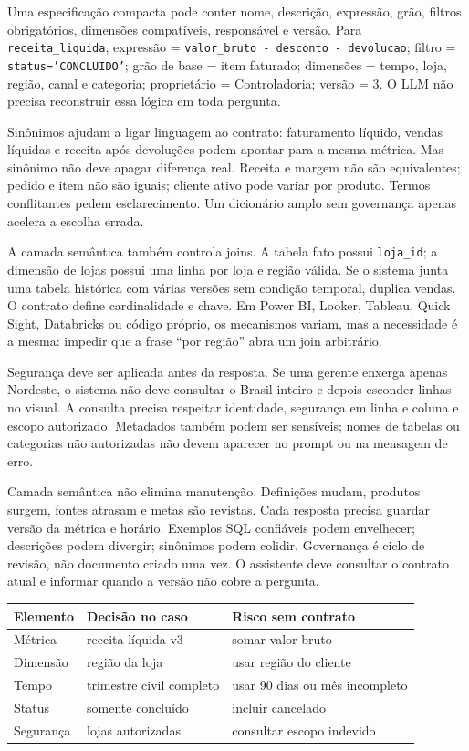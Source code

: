 Uma especificação compacta pode conter nome, descrição, expressão, grão, filtros obrigatórios, dimensões compatíveis, responsável e versão. Para \texttt{receita\_liquida}, expressão = \texttt{valor\_bruto - desconto - devolucao}; filtro = \texttt{status='CONCLUIDO'}; grão de base = item faturado; dimensões = tempo, loja, região, canal e categoria; proprietário = Controladoria; versão = 3. O LLM não precisa reconstruir essa lógica em toda pergunta.

Sinônimos ajudam a ligar linguagem ao contrato: faturamento líquido, vendas líquidas e receita após devoluções podem apontar para a mesma métrica. Mas sinônimo não deve apagar diferença real. Receita e margem não são equivalentes; pedido e item não são iguais; cliente ativo pode variar por produto. Termos conflitantes pedem esclarecimento. Um dicionário amplo sem governança apenas acelera a escolha errada.

A camada semântica também controla joins. A tabela fato possui \texttt{loja\_id}; a dimensão de lojas possui uma linha por loja e região válida. Se o sistema junta uma tabela histórica com várias versões sem condição temporal, duplica vendas. O contrato define cardinalidade e chave. Em Power BI, Looker, Tableau, Quick Sight, Databricks ou código próprio, os mecanismos variam, mas a necessidade é a mesma: impedir que a frase ``por região'' abra um join arbitrário.

Segurança deve ser aplicada antes da resposta. Se uma gerente enxerga apenas Nordeste, o sistema não deve consultar o Brasil inteiro e depois esconder linhas no visual. A consulta precisa respeitar identidade, segurança em linha e coluna e escopo autorizado. Metadados também podem ser sensíveis; nomes de tabelas ou categorias não autorizadas não devem aparecer no prompt ou na mensagem de erro.

Camada semântica não elimina manutenção. Definições mudam, produtos surgem, fontes atrasam e metas são revistas. Cada resposta precisa guardar versão da métrica e horário. Exemplos SQL confiáveis podem envelhecer; descrições podem divergir; sinônimos podem colidir. Governança é ciclo de revisão, não documento criado uma vez. O assistente deve consultar o contrato atual e informar quando a versão não cobre a pergunta.

\begin{center}
\begin{tabularx}{\textwidth}{p{2.8cm}Y Y}
\toprule
Elemento & Decisão no caso & Risco sem contrato \\
\midrule
Métrica & receita líquida v3 & somar valor bruto \\
Dimensão & região da loja & usar região do cliente \\
Tempo & trimestre civil completo & usar 90 dias ou mês incompleto \\
Status & somente concluído & incluir cancelado \\
Segurança & lojas autorizadas & consultar escopo indevido \\
\bottomrule
\end{tabularx}
\end{center}


